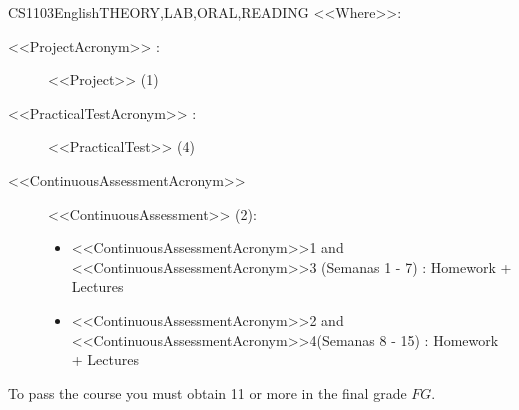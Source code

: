 \begin{evaluation}{CS1103}{English}{THEORY,LAB,ORAL,READING}
    \vspace{2mm}
    \noindent <<Where>>:
    \begin{description}
      \item[<<ProjectAcronym>> :] <<Project>> (1)
      \item[<<PracticalTestAcronym>> :] <<PracticalTest>> (4)
      \item[<<ContinuousAssessmentAcronym>>] <<ContinuousAssessment>> (2):
        \begin{itemize}
            \item <<ContinuousAssessmentAcronym>>1 and <<ContinuousAssessmentAcronym>>3 (Semanas 1 - 7) : Homework + Lectures
            \item <<ContinuousAssessmentAcronym>>2 and <<ContinuousAssessmentAcronym>>4(Semanas 8 - 15) : Homework + Lectures
        \end{itemize}
    \end{description}
 
  \noindent To pass the course you must obtain 11 or more in the final grade $FG$.
  \end{evaluation}
 

